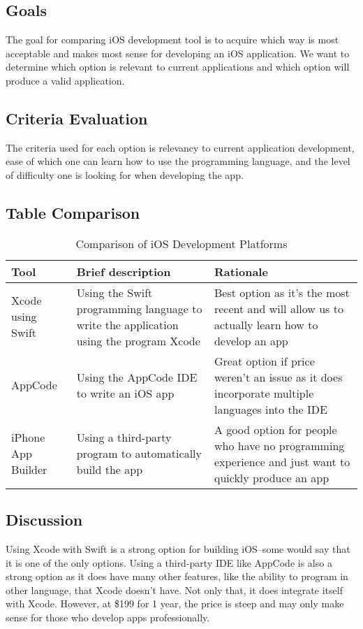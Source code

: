 \documentclass[letterpaper,10pt,draftclsnofoot,onecolumn,titlepage]{IEEEtran}
\begin{document}
	\subsection{Goals}
	The goal for comparing iOS development tool is to acquire which way is most acceptable and makes most sense for developing an iOS application.
	We want to determine which option is relevant to current applications and which option will produce a valid application.
	\subsection{Criteria Evaluation}
	The criteria used for each option is relevancy to current application development, ease of which one can learn how to use the programming language, and the level of difficulty one is looking for when developing the app.
	\subsection{Table Comparison}

	\begin{table}[ht]
	\caption{Comparison of iOS Development Platforms}
	\begin{center}
	\begin{tabular} { | m{3cm} | m{5cm} | m{5cm} | }
	\hline\hline
	Tool & Brief description & Rationale \\ [0.5ex]
	\hline
	Xcode using Swift & Using the Swift programming language to write the application using the program Xcode & Best option as it's the most recent and will allow us to actually learn how to develop an app \\
	\hline
	AppCode & Using the AppCode IDE to write an iOS app & Great option if price weren't an issue as it does incorporate multiple languages into the IDE \\
	\hline
	iPhone App Builder & Using a third-party program to automatically build the app & A good option for people who have no programming experience and just want to quickly produce an app \\
	\hline
	\end{tabular}
	\end{center}
	\end{table}

	\subsection{Discussion}
	Using Xcode with Swift is a strong option for building iOS--some would say that it is one of the only options.
	Using a third-party IDE like AppCode is also a strong option as it does have many other features, like the ability to program in other language, that Xcode doesn't have. Not only that, it does integrate itself with Xcode. However, at \$199 for 1 year, the price is steep and may only make sense for those who develop apps professionally.
\end{document}
